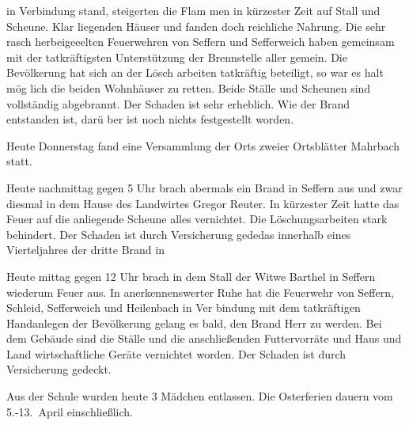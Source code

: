 

\unsicher in Verbindung stand, steigerten die Flam\ohb
men in kürzester Zeit auf Stall und Scheune. Klar\ohb
liegenden Häuser\unsicher{} und fanden doch reichliche\ob
Nahrung. Die sehr rasch herbeigeeelten Feuerwehren\ob
von Seffern und Sefferweich haben gemeinsam mit\ob
der tatkräftigsten Unterstützung der Brennstelle aller\ob
gemein\unsicher. Die Bevölkerung hat sich an der Lösch\ohb
arbeiten tatkräftig beteiligt, so war es halt mög\ohb
lich die beiden Wohnhäuser zu retten. Beide Ställe\ob
und Scheunen sind vollständig abgebrannt. Der Schaden\ob
ist sehr erheblich. Wie der Brand entstanden ist, darü\ohb
ber ist noch nichts festgestellt worden.

%
Heute Donnerstag fand eine Versammlung der Orts\unsicher\ohb
\unsicher zweier Ortsblätter Mahrbach statt.

%
Heute nachmittag gegen 5 Uhr brach abermals ein\ob
Brand in Seffern aus und zwar diesmal in dem\ob
Hause des Landwirtes Gregor Reuter. In kürzester\ob
Zeit hatte das Feuer auf die anliegende Scheune\ob
alles vernichtet. Die Löschungsarbeiten\unsicher{} stark behindert.\ob
Der Schaden ist durch Versicherung gede\unsicher das\ob
innerhalb eines Vierteljahres der dritte Brand in

%
Heute mittag gegen 12 Uhr brach in dem\unsicher{} Stall\ob
der Witwe Barthel in Seffern wiederum Feuer aus.\ob
In anerkennenswerter Ruhe hat die Feuerwehr von\ob
Seffern, Schleid, Sefferweich und Heilenbach in Ver\ohb
bindung mit dem tatkräftigen Handanlegen der\ob
Bevölkerung gelang es bald, den Brand Herr zu\ob
werden. Bei dem Gebäude sind die Ställe und\ob
die anschließenden Futtervorräte und Haus und Land\ohb
wirtschaftliche Geräte vernichtet worden. Der Schaden ist\ob
durch Versicherung gedeckt.

%
Aus der Schule wurden heute 3 Mädchen entlassen.\ob
Die Osterferien dauern vom 5.-13.\ April einschließlich.
\pend
